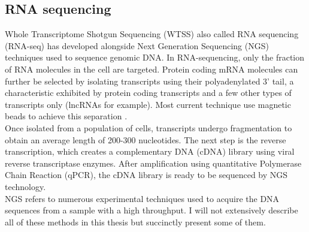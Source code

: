      \subsection{RNA sequencing}
     Whole Transcriptome Shotgun Sequencing (WTSS) also called RNA sequencing (RNA-seq) \cite{morin08,wang09} has developed alongside Next Generation Sequencing (NGS) techniques used to sequence genomic DNA. In RNA-sequencing, only the fraction of RNA molecules in the cell are targeted. Protein coding mRNA molecules can further be selected by isolating transcripts using their polyadenylated 3' tail, a characteristic exhibited by protein coding transcripts and a few other types of transcripts only (lncRNAs for example). Most current technique use magnetic beads to achieve this separation \cite{mortazavi08,morin08}.\\
     
    Once isolated from a population of cells, transcripts undergo fragmentation to obtain an average length of 200-300 nucleotides. The next step is the reverse transcription, which creates a complementary DNA (cDNA) library using viral reverse transcriptase enzymes. After amplification using quantitative Polymerase Chain Reaction (qPCR), the cDNA library is ready to be sequenced by NGS technology.\\
    
    NGS refers to numerous experimental techniques used to acquire the DNA sequences from a sample with a high throughput. I will not extensively describe all of these methods in this thesis but succinctly present some of them. 
    
